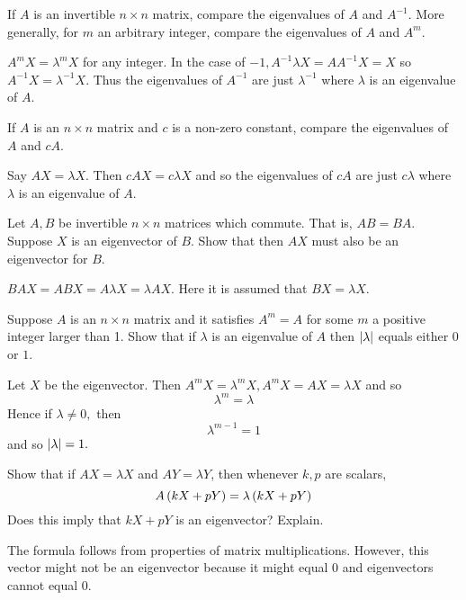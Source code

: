\begin{enumialphparenastyle}

\begin{ex} If $A$ is an invertible $n\times n$ matrix, compare the eigenvalues of
$A$ and $A^{-1}$. More generally, for $m$ an arbitrary integer, compare the
eigenvalues of $A$ and $A^{m}$. \vspace{1mm}
\begin{sol}
$A^{m}X=\lambda ^{m}X$ for
any integer. In the case of $-1,A^{-1}\lambda X=AA^{-1}X=X$
so $A^{-1}X =\lambda ^{-1}X$. Thus the eigenvalues of $A^{-1}$ are just $\lambda ^{-1}$ where $\lambda $ is an eigenvalue of $A$.
\end{sol}
\end{ex} 

\begin{ex} If $A$ is an $n\times n$ matrix and $c$ is a non-zero constant, compare
the eigenvalues of $A$ and $cA$. \vspace{1mm} 
\begin{sol}
Say $AX=\lambda X.$ Then $
cAX=c\lambda X$ and so the eigenvalues of $cA$ are just $
c\lambda $ where $\lambda $ is an eigenvalue of $A$.
\end{sol}
\end{ex}

\begin{ex} Let $A,B$ be invertible $n\times n$ matrices which commute. That is, $AB=BA$. Suppose $X$ is an eigenvector of $B$. Show that then 
$AX$ must also be an eigenvector for $B$. \vspace{1mm} 
\begin{sol}
 $BAX=ABX
=A\lambda X=\lambda AX$. Here it is assumed that $BX=\lambda X$.
\end{sol}
\end{ex}

\begin{ex} Suppose $A$ is an $n\times n$ matrix and it satisfies $A^{m}=A$ for
some $m$ a positive integer larger than 1. Show that if $\lambda $ is an
eigenvalue of $A$ then $\left|\lambda \right|$ equals either 0 or $
1$. \vspace{1mm}
\begin{sol}
Let $X$ be the eigenvector. Then $A^{m}X=\lambda ^{m}
X,A^{m}X=AX=\lambda X$ and so
\[
\lambda ^{m}=\lambda
\]
Hence if $\lambda \neq 0,$ then
\[
\lambda ^{m-1}=1
\]
and so $\left|\lambda \right|=1.$
\end{sol}
\end{ex}

\begin{ex} Show that if $AX=\lambda X$ and $AY=\lambda Y$, then whenever $k,p$ are scalars,
\begin{equation*}
A\left(kX+pY\right) =\lambda \left(kX+pY\right) 
\end{equation*}
Does this imply that $kX+pY$ is an eigenvector? Explain.
\vspace{1mm} 
\begin{sol}
The formula follows from properties of matrix multiplications. However,
this vector might not be an eigenvector because it might equal $0$
and eigenvectors cannot equal $0$. 
\end{sol}
\end{ex}


\end{enumialphparenastyle}

